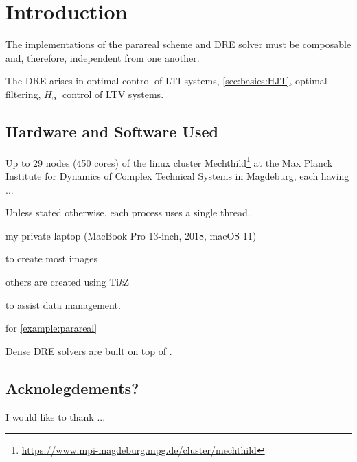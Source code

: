 \chapter{Introduction}

The implementations of the parareal scheme and \ac{DRE} solver must be composable and,
therefore, independent from one another.

The \ac{DRE} arises in \eg optimal control of \ac{LTI} systems, \cf \autoref{sec:basics:HJT},
optimal filtering, $H_\infty$ control of \ac{LTV} systems.

\section*{Hardware and Software Used}

Up to 29 nodes (450 cores) of the linux cluster Mechthild\footnote{\url{https://www.mpi-magdeburg.mpg.de/cluster/mechthild}}
at the Max Planck Institute for Dynamics of Complex Technical Systems in Magdeburg, each having ...

Unless stated otherwise, each process uses a single thread.

my private laptop (MacBook Pro 13-inch, 2018, macOS 11)

 \cite{Makie} to create most images

others are created using Ti\emph{k}Z \cite{TikZ}

 \cite{DrWatson} to assist data management.

 \cite{DifferentialEquations} for \autoref{example:parareal}

Dense \ac{DRE} solvers are built on top of  \cite{MatrixEquations}.

\section*{Acknolegdements?}

I would like to thank ...
